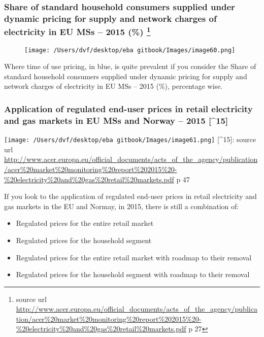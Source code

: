 \documentclass[]{book}
\providecommand{\tightlist}{%
  \setlength{\itemsep}{0pt}\setlength{\parskip}{0pt}}
\let\rmarkdownfootnote\footnote%
\def\footnote{\protect\rmarkdownfootnote}
\theoremstyle{definition}
\theoremstyle{definition}
\theoremstyle{definition}
\theoremstyle{remark}
\begin{document}
\subsubsection[Share of standard household consumers supplied under
dynamic pricing for supply and network charges of electricity in EU MSs
-- 2015 (\%) ]{\texorpdfstring{Share of standard household consumers
supplied under dynamic pricing for supply and network charges of
electricity in EU MSs -- 2015 (\%) \footnote{source url
  \url{http://www.acer.europa.eu/official_documents/acts_of_the_agency/publication/acer\%20market\%20monitoring\%20report\%202015\%20-\%20electricity\%20and\%20gas\%20retail\%20markets.pdf}
  p 27}}{Share of standard household consumers supplied under dynamic pricing for supply and network charges of electricity in EU MSs -- 2015 (\%) }}\label{share-of-standard-household-consumers-supplied-under-dynamic-pricing-for-supply-and-network-charges-of-electricity-in-eu-mss-2015-14}

\begin{figure}[htbp]
\centering
\texttt{[image: /Users/dvf/desktop/eba gitbook/Images/image60.png]}
\caption{}
\end{figure}

Where time of use pricing, in blue, is quite prevalent if you consider
the Share of standard household consumers supplied under dynamic pricing
for supply and network charges of electricity in EU MSs -- 2015 (\%),
percentage wise.

\subsubsection{Application of regulated end-user prices in retail
electricity and gas markets in EU MSs and Norway -- 2015
{[}\^{}15{]}}\label{application-of-regulated-end-user-prices-in-retail-electricity-and-gas-markets-in-eu-mss-and-norway-2015-15}

\texttt{[image: /Users/dvf/desktop/eba gitbook/Images/image61.png]}
{[}\^{}15{]}: source url
\url{http://www.acer.europa.eu/official_documents/acts_of_the_agency/publication/acer\%20market\%20monitoring\%20report\%202015\%20-\%20electricity\%20and\%20gas\%20retail\%20markets.pdf}
p 47

If you look to the application of regulated end-user prices in retail
electricity and gas markets in the EU and Normay, in 2015, there is
still a combination of:

\begin{itemize}
\tightlist
\item
  Regulated prices for the entire retail market
\item
  Regulated prices for the household segment
\item
  Regulated prices for the entire retail market with roadmap to their
  removal
\item
  Regulated prices for the household segment with roadmap to their
  removal
\end{itemize}
\end{document}
